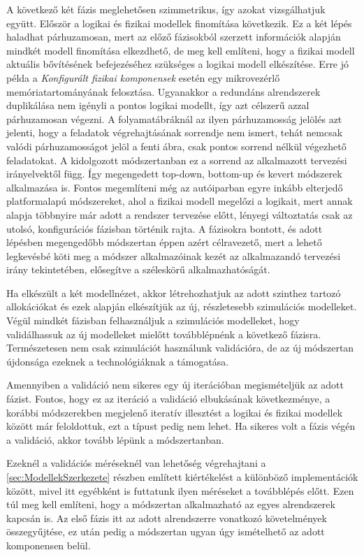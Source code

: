         A következő két fázis meglehetősen szimmetrikus, így azokat vizsgálhatjuk együtt. Először a logikai és fizikai modellek finomítása következik. Ez a két lépés haladhat párhuzamosan, mert az előző fázisokból szerzett információk alapján mindkét modell finomítása elkezdhető, de meg kell említeni, hogy a fizikai modell aktuális bővítésének befejezéséhez  szükséges a logikai modell elkészítése. Erre jó példa a \emph{Konfigurált fizikai komponensek} esetén egy mikrovezérlő memóriatartományának felosztása.
        Ugyanakkor a redundáns alrendszerek duplikálása nem igényli a pontos logikai modellt, így azt célszerű azzal párhuzamosan végezni. A folyamatábráknál az ilyen párhuzamosság jelölés azt jelenti, hogy a feladatok végrehajtásának sorrendje nem ismert, tehát nemcsak valódi párhuzamosságot jelöl a fenti ábra, csak pontos sorrend nélkül végezhető feladatokat.
        A kidolgozott módszertanban ez a sorrend az alkalmazott tervezési irányelvektől függ. Így megengedett top-down, bottom-up és kevert módszerek alkalmazása is. Fontos megemlíteni még az autóiparban egyre inkább elterjedő platformalapú módszereket, ahol a fizikai modell megelőzi a logikait, mert annak alapja többnyire már adott a rendszer tervezése előtt, lényegi változtatás csak az utolsó, konfigurációs fázisban történik rajta.
        A fázisokra bontott, és adott lépésben megengedőbb módszertan éppen azért célravezető, mert a lehető legkevésbé köti meg a módszer alkalmazóinak kezét az alkalmazandó tervezési irány tekintetében, elősegítve a széleskörű alkalmazhatóságát.
        
        Ha elkészült a két modellnézet, akkor létrehozhatjuk az adott szinthez tartozó allokációkat és ezek alapján elkészítjük az új, részletesebb szimulációs modelleket.
        Végül mindkét fázisban felhasználjuk a szimulációs modelleket, hogy validálhassuk az új modelleket mielőtt továbblépnénk a következő fázisra. Természetesen nem csak szimulációt használunk validációra, de az új módszertan újdonsága ezeknek a technológiáknak a támogatása.
        
        Amennyiben a validáció nem sikeres egy új iterációban megismételjük az adott fázist. Fontos, hogy ez az iteráció a validáció elbukásának következménye, a korábbi módszerekben megjelenő iteratív illesztést a logikai és fizikai modellek között már feloldottuk, ezt a típust pedig nem lehet.
        Ha sikeres volt a fázis végén a validáció, akkor tovább lépünk a módszertanban.
        
        Ezeknél a validációs méréseknél van lehetőség végrehajtani a \ref{sec:ModellekSzerkezete} részben említett kiértékelést a különböző implementációk között, mivel itt egyébként is futtatunk ilyen méréseket a továbblépés előtt.
        Ezen túl meg kell említeni, hogy a módszertan alkalmazható az egyes alrendszerek kapcsán is. Az első fázis itt az adott alrendszerre vonatkozó követelmények összegyűjtése, ez után pedig a módszertan ugyan úgy ismételhető az adott komponensen belül.

